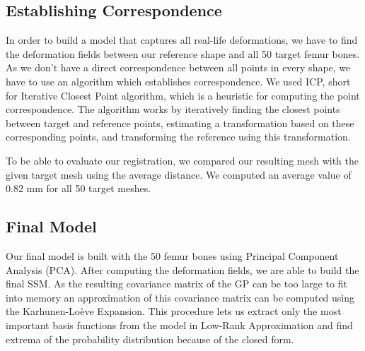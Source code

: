 \documentclass{article} %
\begin{document}
\subsection{Establishing Correspondence}
\label{establishing_correspondence}
In order to build a model that captures all real-life deformations, we have to find the deformation fields between our reference shape and all 50 target femur bones. As we don't have a direct correspondence between all points in every shape, we have to use an algorithm which establishes correspondence. We used ICP, short for Iterative Closest Point algorithm, which is a heuristic for computing the point correspondence. The algorithm works by iteratively finding the closest points between target and reference points, estimating a transformation based on these corresponding points, and transforming the reference using this transformation.\par
To be able to evaluate our registration, we compared our resulting mesh with the given target mesh using the average distance. We computed an average value of 0.82 mm for all 50 target meshes.

\subsection{Final Model}
Our final model is built with the 50 femur bones using Principal Component Analysis (PCA). After computing the deformation fields, we are able to build the final SSM. As the resulting covariance matrix of the GP can be too large to fit into memory an approximation of this covariance matrix can be computed using the Karhunen-Loève Expansion. This procedure lets us extract only the most important basis functions from the model in Low-Rank Approximation and find extrema of the probability distribution because of the closed form.\par
\end{document}
